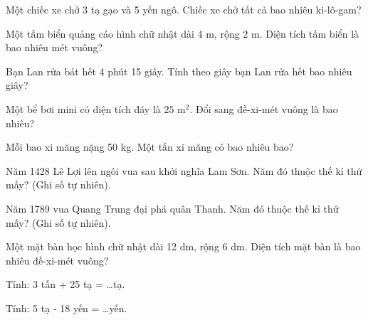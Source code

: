 \begin{ex}
Một chiếc xe chở 3 tạ gạo và 5 yến ngô. Chiếc xe chở tất cả bao nhiêu ki-lô-gam?
\end{ex}

\begin{ex}
Một tấm biển quảng cáo hình chữ nhật dài 4 m, rộng 2 m. Diện tích tấm biển là bao nhiêu mét vuông?
\end{ex}

\begin{ex}
Bạn Lan rửa bát hết 4 phút 15 giây. Tính theo giây bạn Lan rửa hết bao nhiêu giây?
\end{ex}

\begin{ex}
Một bể bơi mini có diện tích đáy là $25\text{ m}^2$. Đổi sang đề-xi-mét vuông là bao nhiêu?
\end{ex}

\begin{ex}
Mỗi bao xi măng nặng 50 kg. Một tấn xi măng có bao nhiêu bao?
\end{ex}

\begin{ex}
Năm 1428 Lê Lợi lên ngôi vua sau khởi nghĩa Lam Sơn. Năm đó thuộc thế kỉ thứ mấy? (Ghi số tự nhiên).
\end{ex}

\begin{ex}
Năm 1789 vua Quang Trung đại phá quân Thanh. Năm đó thuộc thế kỉ thứ mấy? (Ghi số tự nhiên).
\end{ex}

\begin{ex}
Một mặt bàn học hình chữ nhật dài 12 dm, rộng 6 dm. Diện tích mặt bàn là bao nhiêu đề-xi-mét vuông?
\end{ex}

\begin{ex}
Tính: 3 tấn + 25 tạ = \dots tạ.
\end{ex}

\begin{ex}
Tính: 5 tạ - 18 yến = \dots yến.
\end{ex}

